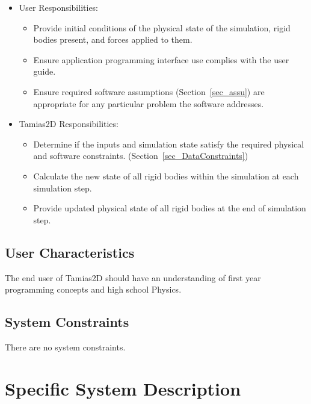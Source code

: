 \documentclass[12pt]{article}
\newcommand{\progname}{Tamias2D}
\begin{document}
\begin{itemize}
\item User Responsibilities:
  \begin{itemize}
  \item Provide initial conditions of the physical state of the simulation, rigid bodies present, and forces applied to them.
  \item Ensure application programming interface use complies with the user guide.
  \item Ensure required software assumptions (Section~\ref{sec_assu}) are
    appropriate for any particular problem the software addresses.
  \end{itemize}
\item \progname{} Responsibilities:
  \begin{itemize}
  \item Determine if the inputs and simulation state satisfy the required physical and software constraints. (Section~\ref{sec_DataConstraints})
  \item Calculate the new state of all rigid bodies within the simulation at each simulation step.
  \item Provide updated physical state of all rigid bodies at the end of simulation step.
  \end{itemize}
\end{itemize}

\subsection{User Characteristics}
\label{Sec_UserChar}

The end user of \progname{} should have an understanding 
of first year programming concepts and high school
Physics.

\subsection{System Constraints}

There are no system constraints.


%
%

\section{Specific System Description}
\end{document}
